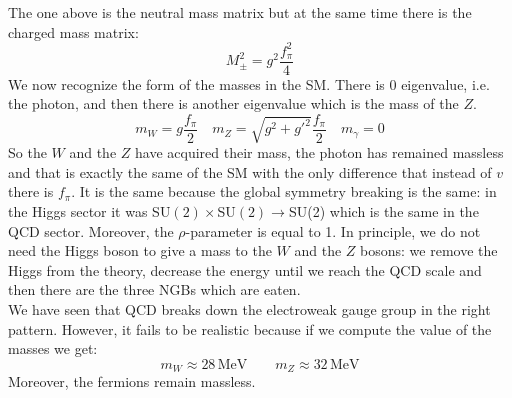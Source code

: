 \documentclass[../main.tex]{subfiles}
\begin{document}
The one above is the neutral mass matrix but at the same time there is the charged mass matrix:
\[
M_\pm^2=g^2\frac{f_\pi^2}{4}
\]
We now recognize the form of the masses in the SM. There is 0 eigenvalue, i.e. the photon, and then there is another eigenvalue which is the mass of the $Z$.
\[
m_W=g\frac{f_\pi}{2} \quad m_Z=\sqrt{g^2+g'^2}\frac{f_\pi}{2} \quad m_\gamma=0
\]
So the $W$ and the $Z$ have acquired their mass, the photon has remained massless and that is exactly the same of the SM with the only difference that instead of $v$ there is $f_\pi$. It is the same because the global symmetry breaking is the same: in the Higgs sector it was SU$(2)\times$SU$(2)\to$SU(2) which is the same in the QCD sector. Moreover, the $\rho$-parameter is equal to 1. In principle, we do not need the Higgs boson to give a mass to the $W$ and the $Z$ bosons: we remove the Higgs from the theory, decrease the energy until we reach the QCD scale and then there are the three NGBs which are eaten.\\
We have seen that QCD breaks down the electroweak gauge group in the right pattern. However, it fails to be realistic because if we compute the value of the masses we get:
\[
m_W\approx28\,\text{MeV} \qquad m_Z\approx32\,\text{MeV}
\]
Moreover, the fermions remain massless.
\end{document}
